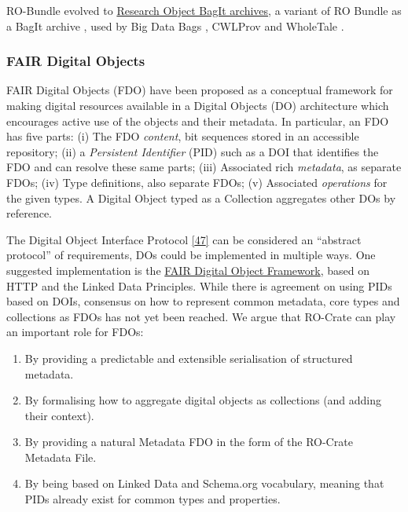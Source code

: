 {RO-Bundle evolved to \href{https://w3id.org/ro/bagit}{Research Object
BagIt archives}, a variant of RO Bundle as a BagIt archive
\cite{ch5-74}, used by Big Data Bags
\cite{Chard 2016},
CWLProv \cite{ch5-68} and
WholeTale \cite{ch5-76}
\cite{Chard 2019}.

\hypertarget{fair-digital-objects}{%
\subsubsection{FAIR Digital Objects}\label{fair-digital-objects}}

FAIR Digital Objects (FDO)
\cite{De Smedt 2020} have been
proposed as a conceptual framework for making digital resources
available in a Digital Objects (DO) architecture which encourages active
use of the objects and their metadata. In particular, an FDO has five
parts: (i) The FDO \emph{content}, bit sequences stored in an accessible
repository; (ii) a \emph{Persistent Identifier} (PID) such as a DOI that
identifies the FDO and can resolve these same parts; (iii) Associated
rich \emph{metadata}, as separate FDOs; (iv) Type definitions, also
separate FDOs; (v) Associated \emph{operations} for the given types. A
Digital Object typed as a Collection aggregates other DOs by reference.

The Digital Object Interface Protocol
\href{https://www.dona.net/sites/default/files/2018-11/DOIPv2Spec_1.pdf}{{[}47{]}}
can be considered an ``abstract protocol'' of requirements, DOs could be
implemented in multiple ways. One suggested implementation is the
\href{https://fairdigitalobjectframework.org/}{FAIR Digital Object
Framework}, based on HTTP and the Linked Data Principles. While there is
agreement on using PIDs based on DOIs, consensus on how to represent
common metadata, core types and collections as FDOs has not yet been
reached. We argue that RO-Crate can play an important role for FDOs:

\begin{enumerate}
\def\labelenumi{\arabic{enumi}.}
\tightlist
\item
  By providing a predictable and extensible serialisation of structured
  metadata.
\item
  By formalising how to aggregate digital objects as collections (and
  adding their context).
\item
  By providing a natural Metadata FDO in the form of the RO-Crate
  Metadata File.
\item
  By being based on Linked Data and Schema.org vocabulary, meaning that
  PIDs already exist for common types and properties.
\end{enumerate}

}
